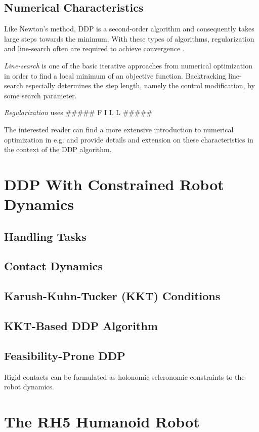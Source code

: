 \subsection{Numerical Characteristics}
Like Newton's method, \gls{DDP} is a second-order algorithm \citep{liao1992advantages} and consequently takes large steps towards the minimum. With these types of algorithms, regularization and line-search often are required to achieve convergence \cite{liao1991convergence}. 

\textit{Line-search} is one of the basic iterative approaches from numerical optimization in order to find a local minimum of an objective function. Backtracking line-search especially determines the step length, namely the control modification, by some search parameter.

\textit{Regularization} uses \#\#\#\#\# F I L L \#\#\#\#\#

The interested reader can find a more extensive introduction to numerical optimization in e.g. \cite{nocedal2006numerical} and \citeauthor{tassa2012synthesis}  
provide details and extension on these characteristics in the context of the \gls{DDP} algorithm.






  


\section{DDP With Constrained Robot Dynamics}

\subsection{Handling Tasks}
\subsection{Contact Dynamics}
\subsection{Karush-Kuhn-Tucker (KKT) Conditions}
\subsection{KKT-Based DDP Algorithm}
\subsection{Feasibility-Prone DDP}
Rigid contacts can be formulated as holonomic scleronomic constraints to the robot dynamics. 

\section{The RH5 Humanoid Robot}












